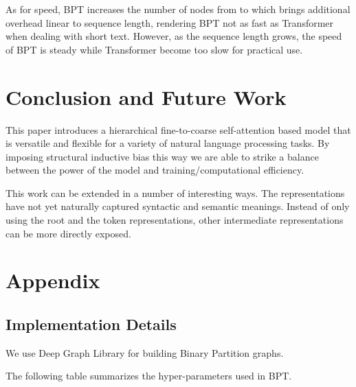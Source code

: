 \documentclass[11pt,a4paper]{article}
\begin{document}
As for speed, BPT increases the number of nodes from  to  which brings additional overhead linear to sequence length, rendering BPT not as fast as Transformer when dealing with short text. However, as the sequence length grows, the speed of BPT is steady while Transformer become too slow for practical use.

\section{Conclusion and Future Work}

This paper introduces a hierarchical fine-to-coarse self-attention based model that is versatile and flexible for a variety of natural language processing tasks.
By imposing structural inductive bias this way we are able to strike a balance between the power of the model and training/computational efficiency.




This work can be extended in a number of interesting ways. The representations have not yet naturally captured syntactic and semantic meanings. Instead of only using the root and the token representations, other intermediate representations can be more directly exposed.





\appendix
\section{Appendix}
\label{sec:appendix}

\subsection{Implementation Details}
\label{app:hyper}
We use Deep Graph Library \cite{wang2019dgl} for building Binary Partition graphs.

The following table summarizes the hyper-parameters used in BPT.
\end{document}
